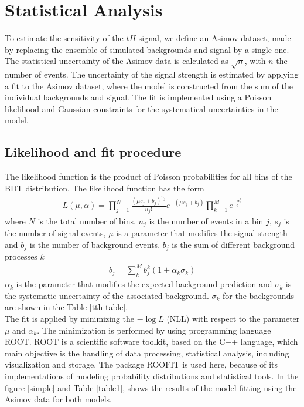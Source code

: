 \chapter{Statistical Analysis}
	To estimate the sensitivity of the $tH$ signal, we define an Asimov dataset, made by replacing the ensemble of simulated backgrounds and signal by a single one. The statistical uncertainty of the Asimov data is calculated as $\sqrt{n}$, with $n$ the number of events. The uncertainty of the signal strength is estimated by applying a fit to the Asimov dataset, where the model
	is constructed from the sum of the individual backgrounds and signal. The fit is implemented using a Poisson likelihood and Gaussian constraints for the systematical uncertainties in the model.
	
	
	\section{Likelihood and fit procedure}
	The likelihood function is the product of Poisson probabilities for all bins of the BDT distribution. The likelihood function has the form
	\begin{align}
		L(\mu,\alpha)=\prod_{j=1}^{N}\frac{(\mu s_j +b_j)^{n_j}}{n_j !}e^{-(\mu s_j+b_j)} \prod_{k=1}^M e^{\frac{-\alpha^2_k}{2}}
	\end{align}
	where $N$ is the total number of bins, $n_j$ is the number of events in a bin $j$, $s_j$ is the number of signal events, $\mu$ is a parameter that modifies the signal strength and $b_j$ is the number of background events.
	$b_j$ is the sum of different background processes $k$
	\begin{align}
		b_j=\sum_k^M b_j^k(1+ \alpha_k \sigma_k)
	\end{align}
	$\alpha_k$ is the parameter that modifies the expected background prediction and $\sigma_k$ is the systematic uncertainty of the associated background. $\sigma_k$ for the backgrounds are shown in the Table \ref{tth-table}.\\
	
	The fit is applied by minimizing the $-\log{L}$ (NLL) with respect to the parameter $\mu$ and $\alpha_k$. The minimization is performed by using programming language ROOT. ROOT is a scientific software toolkit, based on the C++ language, which main objective is the handling of data processing, statistical analysis, including visualization and storage. The package ROOFIT is used here, because of its implementations of modeling probability distributions and statistical tools\cite{roofit}. In the figure \ref{simple} and Table \ref{table1}, shows the results of the model fitting using the Asimov data for both models. \\
	
